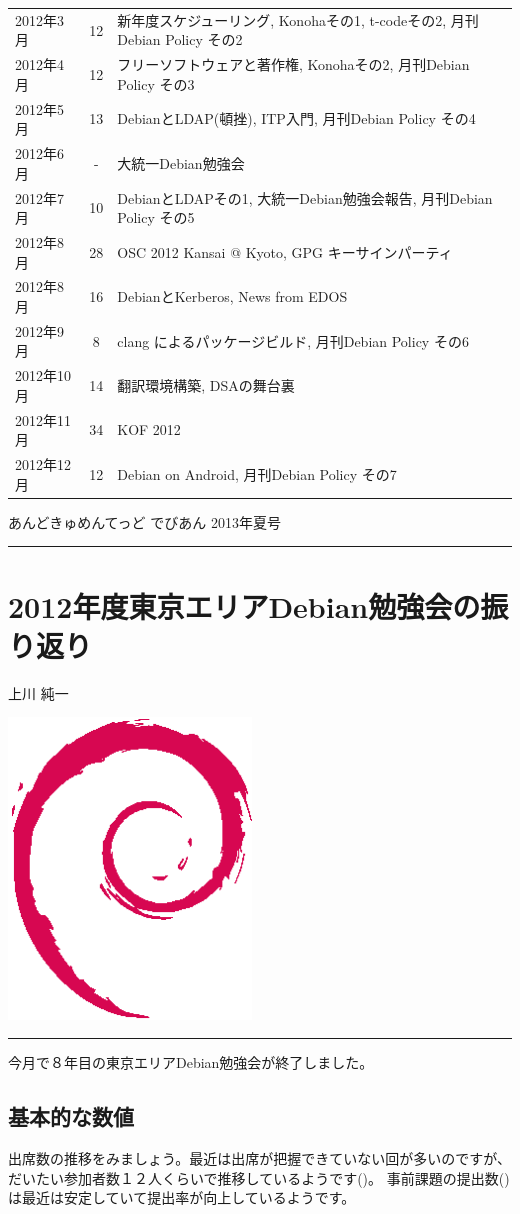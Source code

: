 \documentclass[mingoth,a4paper]{jsarticle}
\renewcommand{\dancersection}[2]{%
\newpage
あんどきゅめんてっど でびあん 2013年夏号
%
\vspace{0.1mm}\\
{\color{dancerdarkblue}\rule{\hsize}{2mm}}

%
%
\begin{minipage}[t]{0.6\hsize}
\color{dancerdarkblue}
\vspace{1cm}
\section{#1}
\hfill{}#2\\
\end{minipage}
\begin{minipage}[t]{0.4\hsize}
\vspace{-2cm}
\hfill{}\includegraphics[height=8cm]{image200502/openlogo-nd.eps}\\
\vspace{-5cm}
\end{minipage}
%
{\color{dancerlightblue}\rule{0.66\hsize}{2mm}}
%
\vspace{2cm}
}
\begin{document}
\begin{table}
\begin{center}
\begin{tabular}{|l|c|l|}
        2012年3月 &12        & 新年度スケジューリング, Konohaその1, t-codeその2, 月刊Debian Policy その2 \\
        2012年4月 &12        & フリーソフトウェアと著作権, Konohaその2, 月刊Debian Policy その3 \\
        2012年5月 &13        & DebianとLDAP(頓挫), ITP入門, 月刊Debian Policy その4 \\
        2012年6月 & -        & 大統一Debian勉強会 \\
        2012年7月 &10        & DebianとLDAPその1, 大統一Debian勉強会報告, 月刊Debian Policy その5 \\
        2012年8月 &28        & OSC 2012 Kansai @ Kyoto, GPG キーサインパーティ\\
        2012年8月 &16        & DebianとKerberos, News from EDOS \\
        2012年9月 & 8        & clang によるパッケージビルド, 月刊Debian Policy その6 \\
        2012年10月&14        & 翻訳環境構築, DSAの舞台裏\\
        2012年11月&34        & KOF 2012\\
        2012年12月&12        & Debian on Android, 月刊Debian Policy その7 \\
        \hline
      \end{tabular}
    \end{center}
\end{table}
\clearpage 

\dancersection{2012年度東京エリアDebian勉強会の振り返り}{上川 純一}

今月で８年目の東京エリアDebian勉強会が終了しました。

\subsection{基本的な数値}

出席数の推移をみましょう。最近は出席が把握できていない回が多いのですが、
だいたい参加者数１２人くらいで推移しているようです()。
事前課題の提出数()は最近は安定していて提出率が向上しているようです。
\end{document}
